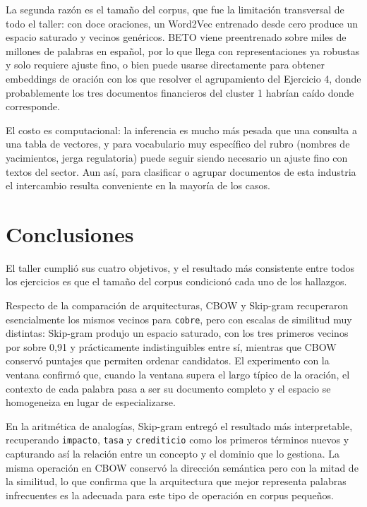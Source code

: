\documentclass[12pt, a4paper]{article}
\newcommand{\code}[1]{\texttt{#1}}
\begin{document}
La segunda razón es el tamaño del corpus, que fue la limitación transversal de todo el taller: con
doce oraciones, un Word2Vec entrenado desde cero produce un espacio saturado y vecinos genéricos.
BETO viene preentrenado sobre miles de millones de palabras en español, por lo que llega con
representaciones ya robustas y solo requiere ajuste fino, o bien puede usarse directamente para
obtener embeddings de oración con los que resolver el agrupamiento del Ejercicio 4, donde
probablemente los tres documentos financieros del cluster 1 habrían caído donde corresponde.

El costo es computacional: la inferencia es mucho más pesada que una consulta a una tabla de
vectores, y para vocabulario muy específico del rubro (nombres de yacimientos, jerga regulatoria)
puede seguir siendo necesario un ajuste fino con textos del sector. Aun así, para clasificar o
agrupar documentos de esta industria el intercambio resulta conveniente en la mayoría de los casos.

\section{Conclusiones}

El taller cumplió sus cuatro objetivos, y el resultado más consistente entre todos los ejercicios es
que el tamaño del corpus condicionó cada uno de los hallazgos.

Respecto de la comparación de arquitecturas, CBOW y Skip-gram recuperaron esencialmente los mismos
vecinos para \code{cobre}, pero con escalas de similitud muy distintas: Skip-gram produjo un espacio
saturado, con los tres primeros vecinos por sobre 0,91 y prácticamente indistinguibles entre sí,
mientras que CBOW conservó puntajes que permiten ordenar candidatos. El experimento con la ventana
confirmó que, cuando la ventana supera el largo típico de la oración, el contexto de cada palabra
pasa a ser su documento completo y el espacio se homogeneiza en lugar de especializarse.

En la aritmética de analogías, Skip-gram entregó el resultado más interpretable, recuperando
\code{impacto}, \code{tasa} y \code{crediticio} como los primeros términos nuevos y capturando así la
relación entre un concepto y el dominio que lo gestiona. La misma operación en CBOW conservó la
dirección semántica pero con la mitad de la similitud, lo que confirma que la arquitectura que mejor
representa palabras infrecuentes es la adecuada para este tipo de operación en corpus pequeños.
\end{document}
